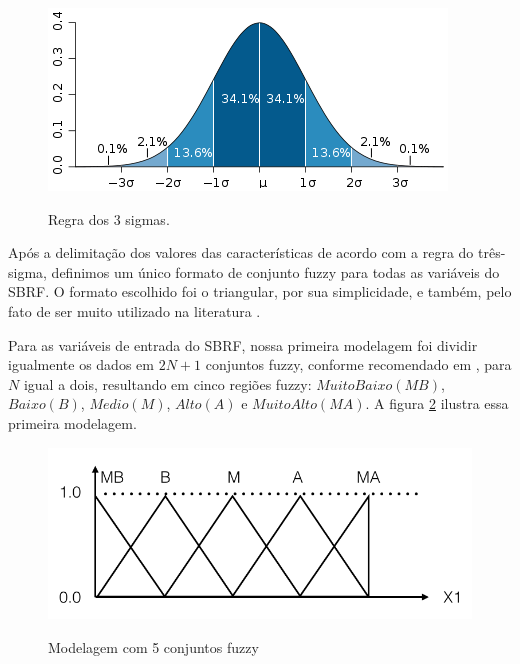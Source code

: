 \begin{figure}[h]
\caption{Regra dos 3 sigmas.}
\centering
\includegraphics[scale=0.85]{regra-dos-3-sigma.png}
\label{figura:regra_3_sigmas}
\end{figure}

Após a delimitação dos valores das características de acordo com a regra do três-sigma, definimos um único formato de conjunto fuzzy para todas as variáveis do SBRF. O formato escolhido foi o triangular, por sua simplicidade, e também, pelo fato de ser muito utilizado na literatura \cite{alcala2009multiobjective, gacto2010integration, antonelli2012multi, cardenas2012multiobjective}.

Para as variáveis de entrada do SBRF, nossa primeira modelagem foi dividir igualmente os dados em $2N + 1$ conjuntos fuzzy, conforme recomendado em \cite{wang1992generating}, para $N$ igual a dois, resultando em cinco regiões fuzzy: $Muito Baixo (MB)$, $Baixo (B)$, $Medio (M)$, $Alto (A)$ e $Muito Alto (MA)$. A figura \ref{figura:cinco_conjuntos_fuzzy} ilustra essa primeira modelagem.

\begin{figure}[H]
\caption{Modelagem com 5 conjuntos fuzzy}
\centering
\includegraphics[scale=0.45]{cinco_conjuntos_fuzzy.png}
\label{figura:cinco_conjuntos_fuzzy}
\end{figure}

